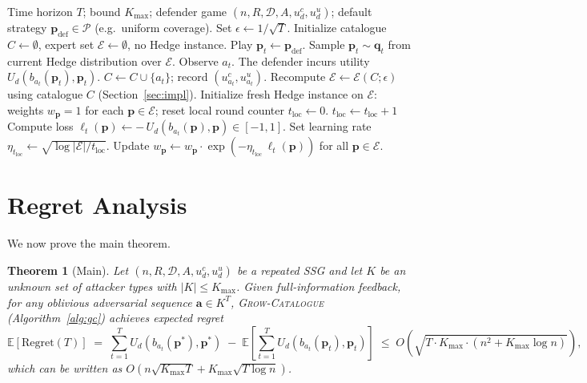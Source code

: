 \documentclass[11pt]{article}
\newtheorem{theorem}{Theorem}
\newcommand{\pvec}{\mathbf{p}}
\newcommand{\qvec}{\mathbf{q}}
\newcommand{\avec}{\mathbf{a}}
\newcommand{\cE}{\mathcal{E}}
\newcommand{\cP}{\mathcal{P}}
\newcommand{\cD}{\mathcal{D}}
\newcommand{\EE}{\mathbb{E}}
\newcommand{\Kmax}{K_{\max}}
\begin{document}
\begin{algorithm}[H]
\caption{\textsc{Grow-Catalogue} (full information)}\label{alg:gc}
\begin{algorithmic}[1]
\Require Time horizon $T$; bound $\Kmax$; defender game $(n,R,\cD,A,u_d^c,u_d^u)$; default strategy $\pvec_{\mathrm{def}} \in \cP$ (e.g.\ uniform coverage).
\State Set $\epsilon \gets 1/\sqrt{T}$. Initialize catalogue $C \gets \emptyset$, expert set $\cE \gets \emptyset$, no Hedge instance.
  \If{$\cE = \emptyset$} \State Play $\pvec_t \gets \pvec_{\mathrm{def}}$.
  \Else \State Sample $\pvec_t \sim \qvec_t$ from current Hedge distribution over $\cE$.
  \EndIf
  \State Observe $a_t$. The defender incurs utility $U_d(b_{a_t}(\pvec_t),\pvec_t)$.
   
     \State $C \gets C \cup \{a_t\}$; record $(u_{a_t}^c, u_{a_t}^u)$.
     \State Recompute $\cE \gets \cE(C;\epsilon)$ using catalogue $C$ (Section~\ref{sec:impl}).
     \State Initialize fresh Hedge instance on $\cE$: weights $w_{\pvec} = 1$ for each $\pvec\in\cE$; reset local round counter $t_{\mathrm{loc}}\gets 0$.
  \Else {}
     \State $t_{\mathrm{loc}} \gets t_{\mathrm{loc}} + 1$
     \For{each $\pvec \in \cE$}
        \State Compute loss $\ell_t(\pvec) \gets -\,U_d(b_{a_t}(\pvec), \pvec) \in [-1,1]$.
     \EndFor
     \State Set learning rate $\eta_{t_{\mathrm{loc}}} \gets \sqrt{\log|\cE| / t_{\mathrm{loc}}}$.
     \State Update $w_{\pvec} \gets w_{\pvec} \cdot \exp(-\eta_{t_{\mathrm{loc}}}\,\ell_t(\pvec))$ for all $\pvec \in \cE$.
  \EndIf
\EndFor
\end{algorithmic}
\end{algorithm}

\section{Regret Analysis}
\label{sec:analysis}

We now prove the main theorem.

\begin{theorem}[Main]\label{thm:main}
Let $(n, R, \cD, A, u_d^c, u_d^u)$ be a repeated SSG and let $K$ be an unknown set of attacker types with $|K| \le \Kmax$. Given full-information feedback, for any oblivious adversarial sequence $\avec \in K^T$, \textsc{Grow-Catalogue} (Algorithm~\ref{alg:gc}) achieves expected regret
\[
\EE[\mathrm{Regret}(T)] \;=\;
\sum_{t=1}^T U_d(b_{a_t}(\pvec^{*}), \pvec^{*}) \;-\; \EE\!\left[\sum_{t=1}^T U_d(b_{a_t}(\pvec_t), \pvec_t)\right]
\;\le\; O\!\left(\sqrt{T \cdot \Kmax \cdot (n^2 + \Kmax \log n)}\right),
\]
which can be written as $O\!\left(n\sqrt{\Kmax T} + \Kmax\sqrt{T\log n}\right)$.
\end{theorem}
\end{document}

